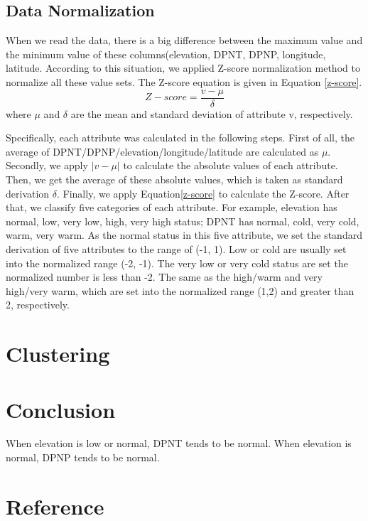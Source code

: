 \documentclass[11pt]{article}
\begin{document}
\subsection{Data Normalization}
When we read the data, there is a big difference between the maximum value and the minimum value of these columns(elevation, DPNT, DPNP, longitude, latitude. According to this situation, we applied Z-score normalization method to normalize all these value sets. The Z-score equation is given in Equation \eqref{z-score}.
\begin{equation}
Z-score = \frac{v-\mu}{\delta} \label{z-score}
\end{equation}
where $\mu$ and $\delta$ are the mean and standard deviation of attribute v, respectively.

Specifically, each attribute was calculated in the following steps. First of all, the average of DPNT/DPNP/elevation/longitude/latitude are calculated as $\mu$. Secondly, we apply $|v-\mu|$ to calculate the absolute values of each attribute. Then, we get the average of these absolute values, which is taken as standard derivation $\delta$. Finally, we apply Equation\eqref{z-score} to calculate the Z-score.
After that, we classify five categories of each attribute. For example, elevation has normal, low, very low, high, very high status; DPNT has normal, cold, very cold, warm, very warm. As the normal status in this five attribute, we set the standard derivation of five attributes to the range of (-1, 1). Low or cold are usually set into the normalized range (-2, -1). The very low or very cold status are set the normalized number is less than -2. The same as the high/warm and very high/very warm, which are set into the normalized range (1,2) and greater than 2, respectively.

\section{Clustering}


\section{Conclusion}
When elevation is low or normal, DPNT tends to be normal. When elevation is normal, DPNP tends to be normal.

\section{Reference}


\end{document}
